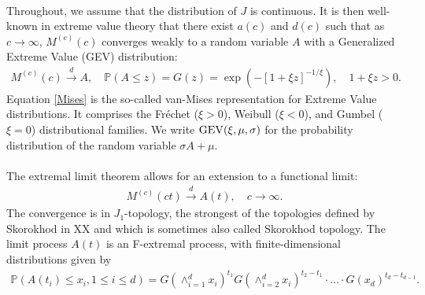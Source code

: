 \documentclass[12pt, a4paper]{article}
\newcommand{\PP}{\mathbb{P}}
\newcommand{\1}{\mathbf 1}
\begin{document}
\paragraph{}
Throughout, we assume that the distribution of $J$ is continuous. 
It is then well-known in extreme value theory that there exist $a(c)$ and $d(c)$
such that as $c \to \infty$,
$M^{(c)}(c)$ converges weakly to a random variable $A$ with a
Generalized Extreme Value (GEV) distribution: 
\begin{align}
M^{(c)}(c) \stackrel{d}{\to} A,
\quad \PP(A \le z) = G(z) = \exp\left(-[1+\xi z]^{-1/\xi}\right), 
\quad 1 + \xi z > 0. \label{Mises}
\end{align}
Equation \eqref{Mises} is the so-called van-Mises representation for 
Extreme Value distributions. 
It comprises the Fr\'echet ($\xi>0$), Weibull ($\xi<0$),
and Gumbel ($\xi = 0$) distributional families. 
We write ${\rm GEV}(\xi, \mu, \sigma)$ for the probability 
distribution of the random variable $\sigma A + \mu$. 

\paragraph{}
The extremal limit theorem allows for an extension to a functional
limit: 
\begin{align} \label{eq:extremal-limit}
M^{(c)}(ct)
\stackrel{d}{\to} A(t),
\quad c \to \infty.
\end{align}
The convergence is in $J_1$-topology, the strongest of the topologies defined by Skorokhod in XX and which is sometimes also called Skorokhod topology. The limit process $A(t)$ is an F-extremal process, with finite-dimensional distributions given by
\begin{align*}
\PP(A(t_i)\leq x_i,1\leq i \leq d) = G(\wedge_{i=1}^d x_i)^{t_1}  G(\wedge_{i=2}^d x_i)^{t_2-t_1} \cdot \ldots \cdot G(x_d)^{t_d-t_{d-1}}.
\end{align*}
\end{document}
